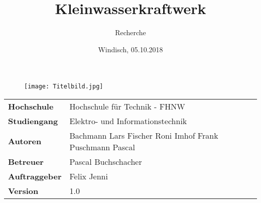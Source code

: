\documentclass[final]{fhnwreport}       %
\title{Kleinwasserkraftwerk}          %
\author{Recherche}          %
\date{Windisch, 05.10.2018}             %
\begin{document}
\maketitle

\vspace*{-1cm}						    %
\vfill
\begin{figure}[H]
\centering
\texttt{[image: Titelbild.jpg]}
\end{figure}
\vfill

{
\renewcommand\arraystretch{2}
\begin{center}
\begin{tabular}{ >{\bf} l p{10cm} l }
Hochschule                 &   Hochschule für Technik - FHNW\\
Studiengang               &  	Elektro- und Informationstechnik\\
Autoren   		       & 	Bachmann Lars \newline  Fischer Roni \newline Imhof Frank \newline Puschmann Pascal\\ 
Betreuer                   	&    Pascal Buchschacher\\
Auftraggeber             	&    Felix Jenni\\
Version                    	&    1.0 %
\end{tabular}
\end{center}
}

\clearpage
{}				%
\thispagestyle{empty}
			
\tableofcontents
\clearpage






{%
}
\end{document}

